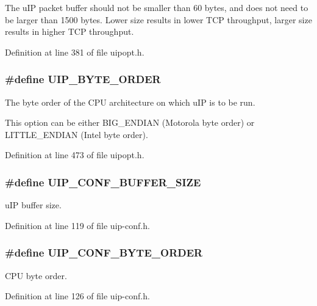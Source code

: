 The uIP packet buffer should not be smaller than 60 bytes, and does not need to be larger than 1500 bytes. Lower size results in lower TCP throughput, larger size results in higher TCP throughput. 

Definition at line 381 of file uipopt.h.

\hypertarget{group__uipopt_ga285a80366aed9428f64282b8d13c918b}{
\subsubsection[{UIP\_\-BYTE\_\-ORDER}]{\setlength{\rightskip}{0pt plus 5cm}\#define UIP\_\-BYTE\_\-ORDER}}
\label{group__uipopt_ga285a80366aed9428f64282b8d13c918b}
The byte order of the CPU architecture on which uIP is to be run.

This option can be either BIG\_\-ENDIAN (Motorola byte order) or LITTLE\_\-ENDIAN (Intel byte order). 

Definition at line 473 of file uipopt.h.

\hypertarget{group__uipfw_gacacc406c3bf7d0e00412e4c946252739}{
\subsubsection[{UIP\_\-CONF\_\-BUFFER\_\-SIZE}]{\setlength{\rightskip}{0pt plus 5cm}\#define UIP\_\-CONF\_\-BUFFER\_\-SIZE}}
\label{group__uipfw_gacacc406c3bf7d0e00412e4c946252739}
uIP buffer size. 

Definition at line 119 of file uip-\/conf.h.

\hypertarget{group__uipfw_gaca1240bba5dd57f8c7c27123c84a1f6d}{
\subsubsection[{UIP\_\-CONF\_\-BYTE\_\-ORDER}]{\setlength{\rightskip}{0pt plus 5cm}\#define UIP\_\-CONF\_\-BYTE\_\-ORDER}}
\label{group__uipfw_gaca1240bba5dd57f8c7c27123c84a1f6d}
CPU byte order. 

Definition at line 126 of file uip-\/conf.h.


